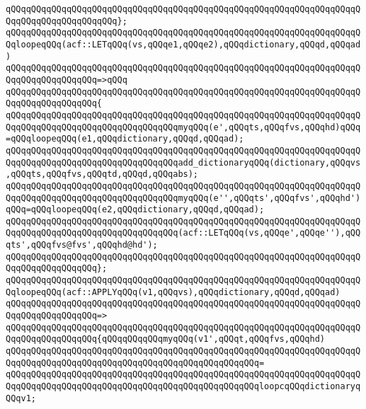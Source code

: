 \verb|qQQqqQQqqQQqqQQqqQQqqQQqqQQqqQQqqQQqqQQqqQQqqQQqqQQqqQQqqQQqqQQqqQQqqQQqqQQqqQQqqQQqqQQqqQQq};|\newline
\newline
\verb|qQQqqQQqqQQqqQQqqQQqqQQqqQQqqQQqqQQqqQQqqQQqqQQqqQQqqQQqqQQqqQQqqQQqqQQqloopeqQQq(acf::LETqQQq(vs,qQQqe1,qQQqe2),qQQqdictionary,qQQqd,qQQqad)|\newline
\verb|qQQqqQQqqQQqqQQqqQQqqQQqqQQqqQQqqQQqqQQqqQQqqQQqqQQqqQQqqQQqqQQqqQQqqQQqqQQqqQQqqQQqqQQq=>qQQq|\newline
\verb|qQQqqQQqqQQqqQQqqQQqqQQqqQQqqQQqqQQqqQQqqQQqqQQqqQQqqQQqqQQqqQQqqQQqqQQqqQQqqQQqqQQqqQQq{|\newline
\verb|qQQqqQQqqQQqqQQqqQQqqQQqqQQqqQQqqQQqqQQqqQQqqQQqqQQqqQQqqQQqqQQqqQQqqQQqqQQqqQQqqQQqqQQqqQQqqQQqqQQqqQQqmyqQQq(e',qQQqts,qQQqfvs,qQQqhd)qQQq=qQQqloopeqQQq(e1,qQQqdictionary,qQQqd,qQQqad);|\newline
\verb|qQQqqQQqqQQqqQQqqQQqqQQqqQQqqQQqqQQqqQQqqQQqqQQqqQQqqQQqqQQqqQQqqQQqqQQqqQQqqQQqqQQqqQQqqQQqqQQqqQQqqQQqadd_dictionaryqQQq(dictionary,qQQqvs,qQQqts,qQQqfvs,qQQqtd,qQQqd,qQQqabs);|\newline
\verb|qQQqqQQqqQQqqQQqqQQqqQQqqQQqqQQqqQQqqQQqqQQqqQQqqQQqqQQqqQQqqQQqqQQqqQQqqQQqqQQqqQQqqQQqqQQqqQQqqQQqqQQqmyqQQq(e'',qQQqts',qQQqfvs',qQQqhd')qQQq=qQQqloopeqQQq(e2,qQQqdictionary,qQQqd,qQQqad);|\newline
\newline
\verb|qQQqqQQqqQQqqQQqqQQqqQQqqQQqqQQqqQQqqQQqqQQqqQQqqQQqqQQqqQQqqQQqqQQqqQQqqQQqqQQqqQQqqQQqqQQqqQQqqQQqqQQq(acf::LETqQQq(vs,qQQqe',qQQqe''),qQQqts',qQQqfvs@fvs',qQQqhd@hd');|\newline
\verb|qQQqqQQqqQQqqQQqqQQqqQQqqQQqqQQqqQQqqQQqqQQqqQQqqQQqqQQqqQQqqQQqqQQqqQQqqQQqqQQqqQQqqQQq};|\newline
\newline
\verb|qQQqqQQqqQQqqQQqqQQqqQQqqQQqqQQqqQQqqQQqqQQqqQQqqQQqqQQqqQQqqQQqqQQqqQQqloopeqQQq(acf::APPLYqQQq(v1,qQQqvs),qQQqdictionary,qQQqd,qQQqad)|\newline
\verb|qQQqqQQqqQQqqQQqqQQqqQQqqQQqqQQqqQQqqQQqqQQqqQQqqQQqqQQqqQQqqQQqqQQqqQQqqQQqqQQqqQQqqQQq=>|\newline
\verb|qQQqqQQqqQQqqQQqqQQqqQQqqQQqqQQqqQQqqQQqqQQqqQQqqQQqqQQqqQQqqQQqqQQqqQQqqQQqqQQqqQQqqQQq{qQQqqQQqqQQqmyqQQq(v1',qQQqt,qQQqfvs,qQQqhd)|\newline
\verb|qQQqqQQqqQQqqQQqqQQqqQQqqQQqqQQqqQQqqQQqqQQqqQQqqQQqqQQqqQQqqQQqqQQqqQQqqQQqqQQqqQQqqQQqqQQqqQQqqQQqqQQqqQQqqQQqqQQqqQQq=|\newline
\verb|qQQqqQQqqQQqqQQqqQQqqQQqqQQqqQQqqQQqqQQqqQQqqQQqqQQqqQQqqQQqqQQqqQQqqQQqqQQqqQQqqQQqqQQqqQQqqQQqqQQqqQQqqQQqqQQqqQQqqQQqloopcqQQqdictionaryqQQqv1;|\newline
